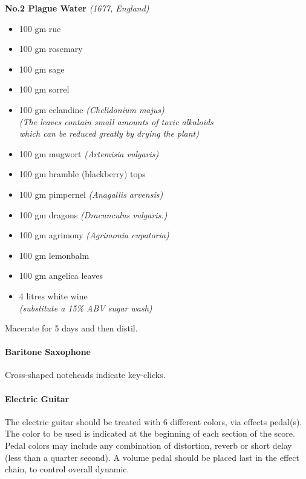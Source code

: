 \documentclass[11pt]{report}
\begin{document}
\begin{titlepage}
\begin{multicols}{3}
{
    \textbf{No.2 Plague Water} \emph{(1677, England)}
    \vspace*{\baselineskip}
    \begin{itemize}
        \renewcommand{\labelitemi}{$\circ$}
        \item 100 gm rue
        \item 100 gm rosemary
        \item 100 gm sage
        \item 100 gm sorrel
        \item 100 gm celandine \emph{(Chelidonium majus)\\
            [0.4\baselineskip]
            (The leaves contain small amounts of toxic alkaloids\\
            which can be reduced greatly by drying the plant)}
        \item 100 gm mugwort \emph{(Artemisia vulgaris)}
        \item 100 gm bramble (blackberry) tops
        \item 100 gm pimpernel \emph{(Anagallis arvensis)}
        \item 100 gm dragons \emph{(Dracunculus vulgaris.)}
        \item 100 gm agrimony \emph{(Agrimonia eupatoria)}
        \item 100 gm lemonbalm
        \item 100 gm angelica leaves
        \item 4 litres white wine\\
            [0.4\baselineskip]
            \emph{(substitute a 15\% ABV sugar wash)}
    \end{itemize}
    \vspace*{\baselineskip}
    Macerate for 5 days and then distil.
}

\columnbreak

{

    \paragraph{Baritone Saxophone}

    Cross-shaped noteheads indicate key-clicks.

    \paragraph{Electric Guitar}

    The electric guitar should be treated with 6 different colors, via effects
    pedal(s). The color to be used is indicated at the beginning of each
    section of the score.  Pedal colors may include any combination of
    distortion, reverb or short delay (less than a quarter second).  A volume
    pedal should be placed last in the effect chain, to control overall
    dynamic.

}
\end{multicols}
\end{titlepage}
\end{document}
